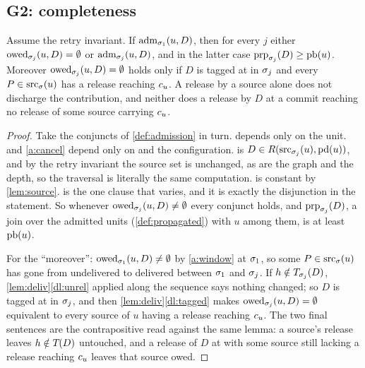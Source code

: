 \subsection{G2: completeness}

\begin{theorem}
\label{thm:g2}
Assume the retry invariant. If $\mathrm{adm}_{\sigma_1}(u,D)$, then for every $j$
either $\mathrm{owed}_{\sigma_j}(u,D) = \emptyset$ or $\mathrm{adm}_{\sigma_j}(u,D)$, and in the
latter case $\mathrm{prp}_{\sigma_j}(D) \geq \mathrm{pb}(u)$. Moreover $\mathrm{owed}_{\sigma_j}(u,D) =
\emptyset$ holds only if $D$ is tagged at \Head{} in $\sigma_j$ and every $P \in
\mathrm{src}_{\sigma}(u)$ has a release reaching $c_{u}$. A release by a source alone
does not discharge the contribution, and neither does a release by $D$ at a
commit reaching no release of some source carrying $c_{u}$.
\end{theorem}

\begin{proof}
Take the conjuncts of \cref{def:admission} in turn.  depends only
on the unit.  and \cref{a:cancel} depend only on \Head{} and the
configuration.  is $D \in R(\mathrm{src}_{\sigma_j}(u),\mathrm{pd}(u))$,
and by the retry invariant the source set is unchanged, as are the graph and
the depth, so the traversal is literally the same computation.
 is constant by \cref{lem:source}.  is the
one clause that varies, and it is exactly the disjunction in the statement. So
whenever $\mathrm{owed}_{\sigma_j}(u,D) \neq \emptyset$ every conjunct holds, and
$\mathrm{prp}_{\sigma_j}(D)$, a join over the admitted units (\cref{def:propagated}) with
$u$ among them, is at least $\mathrm{pb}(u)$.

For the ``moreover'': $\mathrm{owed}_{\sigma_1}(u,D) \neq \emptyset$ by
\cref{a:window} at $\sigma_1$, so some $P \in \mathrm{src}_{\sigma}(u)$ has gone from
undelivered to delivered between $\sigma_1$ and $\sigma_j$. If $h \notin
T_{\sigma_j}(D)$, \cref{lem:deliv}\ref{dl:unrel} applied along the sequence
says nothing changed; so $D$ is tagged at \Head{} in $\sigma_j$, and then
\cref{lem:deliv}\ref{dl:tagged} makes $\mathrm{owed}_{\sigma_j}(u,D) = \emptyset$
equivalent to every source of $u$ having a release reaching $c_{u}$. The two
final sentences are the contrapositive read against the same lemma: a source's
release leaves $h \notin T_{}(D)$ untouched, and a release of $D$ at
\Head{} with some source still lacking a release reaching $c_{u}$ leaves that
source owed.
\end{proof}

